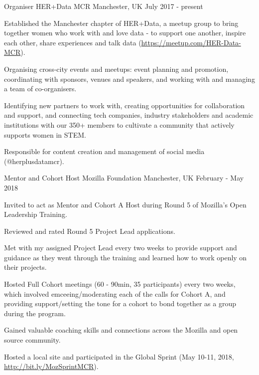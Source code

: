 \begin{cventries}
\cventry
    {Organiser}
    {HER+Data MCR}
    {Manchester, UK}
    {July 2017 - present}
    {
      \begin{cvitems}
        \item {Established the Manchester chapter of HER+Data, a meetup group to bring together women who work with and love data - to support one another, inspire each other, share experiences and talk data (\url{https://meetup.com/HER-Data-MCR}).}
        \item {Organising cross-city events and meetups: event planning and promotion, coordinating with sponsors, venues and speakers, and working with and managing a team of co-organisers.}
        \item {Identifying new partners to work with, creating opportunities for collaboration and support, and connecting tech companies, industry stakeholders and academic institutions with our 350+ members to cultivate a community that actively supports women in STEM.}
        \item {Responsible for content creation and management of social media (@herplusdatamcr).}
      \end{cvitems}
    }
\cventry
    {Mentor and Cohort Host}
    {Mozilla Foundation}
    {Manchester, UK}
    {February - May 2018}
    {
      \begin{cvitems}
        \item{Invited to act as Mentor and Cohort A Host during Round 5 of Mozilla's Open Leadership Training.}
        \item{Reviewed and rated Round 5 Project Lead applications.}
        \item{Met with my assigned Project Lead every two weeks to provide support and guidance as they went through the training and learned how to work openly on their projects.}
        \item{Hosted Full Cohort meetings (60 - 90min, 35 participants) every two weeks, which involved emceeing/moderating each of the calls for Cohort A, and providing support/setting the tone for a cohort to bond together as a group during the program.}
        \item{Gained valuable coaching skills and connections across the Mozilla and open source community.}
        \item{Hosted a local site and participated in the Global Sprint (May 10-11, 2018, \url{http://bit.ly/MozSprintMCR}).}
      \end{cvitems}
}
\end{cventries}
